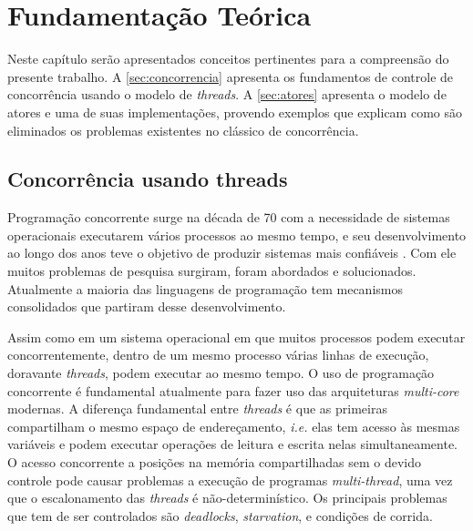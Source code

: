 
\chapter{Fundamentação Teórica}
\label{chap:fundamentacaoTeorica}

Neste capítulo serão apresentados conceitos pertinentes para a compreensão do presente trabalho. A \autoref{sec:concorrencia} apresenta os fundamentos de controle de concorrência usando o modelo de \textit{threads}. A \autoref{sec:atores} apresenta o modelo de atores e uma de suas implementações, provendo exemplos que explicam como são eliminados os problemas existentes no clássico de concorrência.

\section{Concorrência usando threads}
\label{sec:concorrencia}

Programação concorrente surge na década de 70 com a necessidade de sistemas operacionais executarem vários processos ao mesmo tempo, e seu desenvolvimento ao longo dos anos teve o objetivo de produzir sistemas mais confiáveis \cite{Hansen2013}. Com ele muitos problemas de pesquisa surgiram, foram abordados e solucionados. Atualmente a maioria das linguagens de programação tem mecanismos consolidados que partiram desse desenvolvimento.

Assim como em um sistema operacional em que muitos processos podem executar concorrentemente, dentro de um mesmo processo várias linhas de execução, doravante \textit{threads}, podem executar ao mesmo tempo. O uso de programação concorrente é fundamental atualmente para fazer uso das arquiteturas \textit{multi-core} modernas. A diferença fundamental entre \textit{threads} é que as primeiras compartilham o mesmo espaço de endereçamento, \textit{i.e.} elas tem acesso às mesmas variáveis e podem executar operações de leitura e escrita nelas simultaneamente. O acesso concorrente a posições na memória compartilhadas sem o devido  controle pode causar problemas a execução de programas \textit{multi-thread}, uma vez que o escalonamento das \textit{threads} é não-determinístico. Os principais problemas que tem de ser controlados são \textit{deadlocks}, \textit{starvation}, e condições de corrida.


